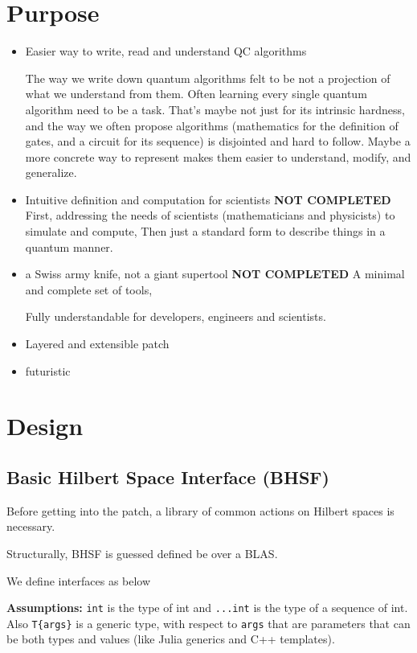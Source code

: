 \documentclass[a4paper,11pt]{article}
\def\co{\lstinline}
\begin{document}
\section{Purpose}
\begin{itemize}
\item Easier way to write, read and understand QC algorithms

The way we write down quantum algorithms felt to be not a projection of what we understand from them. Often learning every single quantum algorithm need to be a task. That's maybe not just for its intrinsic hardness, and the way we often propose algorithms (mathematics for the definition of gates, and a circuit for its sequence) is disjointed and hard to follow. Maybe a more concrete way to represent makes them easier to understand, modify, and generalize.


\item Intuitive definition and computation for scientists
\textbf{NOT COMPLETED}
First, addressing the needs of scientists (mathematicians and physicists) to simulate and compute,
Then just a standard form to describe things in a quantum manner.

\item a Swiss army knife, not a giant supertool
\textbf{NOT COMPLETED}
A minimal and complete set of tools, 

Fully understandable for developers, engineers and scientists.

\item Layered and extensible patch

\item futuristic
\end{itemize}

\section{Design}

\subsection{Basic Hilbert Space Interface (BHSF)}
Before getting into the patch, a library of common actions on Hilbert spaces is necessary.

Structurally, BHSF is guessed defined be over a BLAS.

We define interfaces as below

\clearpage

\textbf{Assumptions: } \co|int| is the type of int and \co{...int} is the type of a sequence of int. Also \co|T{args}| is a generic type, with respect to \co{args} that are parameters that can be both types and values (like Julia generics and C++ templates).
\end{document}
